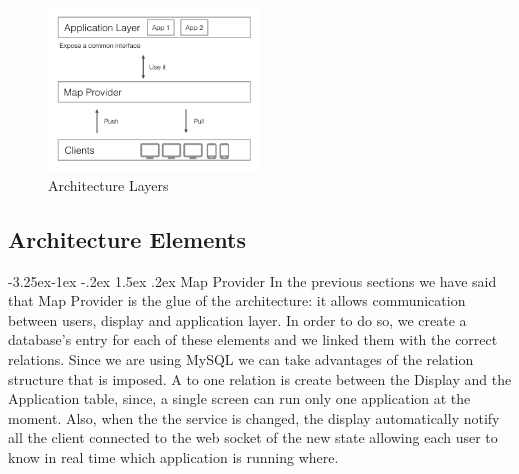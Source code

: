 \documentclass[]{usiinfbachelorproject}
\makeatletter
\newcommand\subsubsection{\@startsection{subsubsection}{3}{\z@}%
                {-3.25ex\@plus -1ex \@minus -.2ex}%
                {1.5ex \@plus .2ex}%
                {\normalfont\normalsize\bfseries}}
\makeatother
\begin{document}
\begin{figure}[H]
  \centering
  \includegraphics[width=0.5\textwidth]{./images/Client_Map_Application.png}
    \caption{Architecture Layers}

\end{figure} 

%
\subsection{Architecture Elements}
%

  
\subsubsection{Map Provider}
In the previous sections we have said that Map Provider is the glue of the architecture: it allows communication between users, display and application layer. In order to do so, we create a database's entry for each of these elements and we linked them with the correct relations. Since we are using MySQL we can take advantages of the relation structure that is imposed. A \one to one relation is create between the Display and the Application table, since, a single screen can run only one application at the moment. Also, when the the service is changed, the display automatically notify all the client connected to the web socket of the new state allowing each user to know in real time which application is running where.
\end{document}

